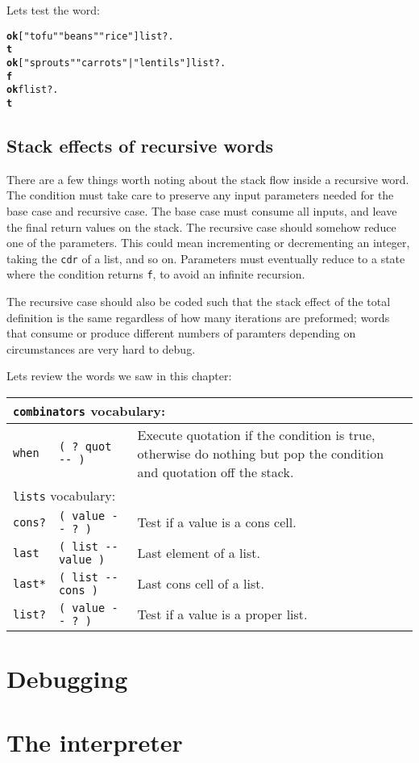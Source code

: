 \documentclass[english]{book}
\newcommand{\wordtable}[1]{{
\begin{tabularx}{12cm}{|l l X|}
#1
\hline
\end{tabularx}}}
\newcommand{\tabvocab}[1]{
\hline
\multicolumn{3}{|l|}{
\rule[-2mm]{0mm}{6mm}
\texttt{#1} vocabulary:}
\\
\hline
}
\begin{document}
Lets test the word:

\begin{alltt}
\textbf{ok} {[} "tofu" "beans" "rice" {]} list? .
\textbf{t}
\textbf{ok} {[} "sprouts" "carrots" | "lentils" {]} list? .
\textbf{f}
\textbf{ok} f list? .
\textbf{t}
\end{alltt}

\subsection{Stack effects of recursive words}

There are a few things worth noting about the stack flow inside a recursive word. The condition must take care to preserve any input parameters needed for the base case and recursive case. The base case must consume all inputs, and leave the final return values on the stack. The recursive case should somehow reduce one of the parameters. This could mean incrementing or decrementing an integer, taking the \texttt{cdr} of a list, and so on. Parameters must eventually reduce to a state where the condition returns \texttt{f}, to avoid an infinite recursion.

The recursive case should also be coded such that the stack effect of the total definition is the same regardless of how many iterations are preformed; words that consume or produce different numbers of paramters depending on circumstances are very hard to debug.

Lets review the words we saw in this chapter:

\wordtable{
\tabvocab{combinators}
\texttt{when}&
\texttt{( ?~quot -{}- )}&
Execute quotation if the condition is true, otherwise do nothing but pop the condition and quotation off the stack.\\
\tabvocab{lists}
\texttt{cons?}&
\texttt{( value -{}- ?~)}&
Test if a value is a cons cell.\\
\texttt{last}&
\texttt{( list -{}- value )}&
Last element of a list.\\
\texttt{last*}&
\texttt{( list -{}- cons )}&
Last cons cell of a list.\\
\texttt{list?}&
\texttt{( value -{}- ?~)}&
Test if a value is a proper list.\\
}

\section{Debugging}

\section{The interpreter}
\end{document}
